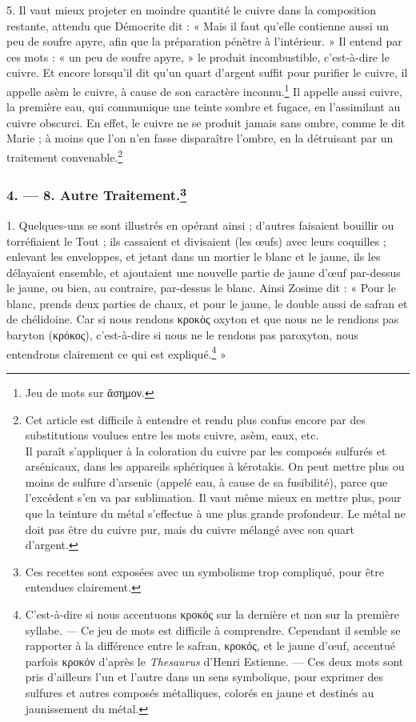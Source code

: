 \documentclass[a4paper, 11pt, oneside, polutonikogreek, french]{article}
\begin{document}
5. Il vaut mieux projeter en moindre quantité le cuivre dans la composition restante, attendu que Démocrite dit : « Mais il faut qu'elle contienne aussi un peu de soufre apyre, afin que la préparation pénètre à l'intérieur. » Il entend par ces mots : « un peu de soufre apyre, » le produit incombustible, c'est-à-dire le cuivre. Et encore lorsqu'il dit qu'un quart d'argent suffit pour purifier le cuivre, il appelle asèm le cuivre, à cause de son caractère inconnu.\footnote{Jeu de mots sur ἄσημον.} Il appelle aussi cuivre, la première eau, qui communique une teinte sombre et fugace, en l'assimilant au cuivre obscurci. En effet, le cuivre ne se produit jamais sans ombre, comme le dit Marie ; à moins que l'on n'en fasse disparaître l'ombre, en la détruisant par un traitement convenable.\footnote{Cet article est difficile à entendre et rendu plus confus encore par des substitutions voulues entre les mots cuivre, asèm, eaux, etc.\\\hspace*{5mm}Il paraît s'appliquer à la coloration du cuivre par les composés sulfurés et arsénicaux, dans les appareils sphériques à kérotakis. On peut mettre plus ou moins de sulfure d'arsenic (appelé eau, à cause de sa fusibilité), parce que l'excédent s'en va par sublimation. Il vaut même mieux en mettre plus, pour que la teinture du métal s'effectue à une plus grande profondeur. Le métal ne doit pas être du cuivre pur, mais du cuivre mélangé avec son quart d'argent.}

\bigskip
\centerline{\EightStarTaper}
\centerline{\EightStarTaper\EightStarTaper}
\bigskip

\subsubsection[4. --- 8. Autre Traitement.]{4. --- 8. Autre Traitement.\footnote{Ces recettes sont exposées avec un symbolisme trop compliqué, pour être entendues clairement.}}

1. Quelques-uns se sont illustrés en opérant ainsi ; d'autres faisaient bouillir ou torréfiaient le Tout ; ils cassaient et divisaient (les œufs) avec leurs coquilles ; enlevant les enveloppes, et jetant dans un mortier le blanc et le jaune, ils les délayaient ensemble, et ajoutaient une nouvelle partie de jaune d'œuf par-dessus le jaune, ou bien, au contraire, par-dessus le blanc. Ainsi Zosime dit : « Pour le blanc, prends deux parties de chaux, et pour le jaune, le double aussi de safran et de chélidoine. Car si nous rendons κροκὸς oxyton et que nous ne le rendions pas baryton (κρόκος), c'est-à-dire si nous ne le rendons pas paroxyton, nous entendrons clairement ce qui est expliqué.\footnote{C'est-à-dire si nous accentuons κροκός sur la dernière et non sur la première syllabe. --- Ce jeu de mots est difficile à comprendre. Cependant il semble se rapporter à la différence entre le safran, κροκός, et le jaune d'œuf, accentué parfois κροκόν d'après le \emph{Thesaurus} d'Henri Estienne. --- Ces deux mots sont pris d'ailleurs l'un et l'autre dans un sens symbolique, pour exprimer des sulfures et autres composés métalliques, colorés en jaune et destinés au jaunissement du métal.} »
\end{document}

